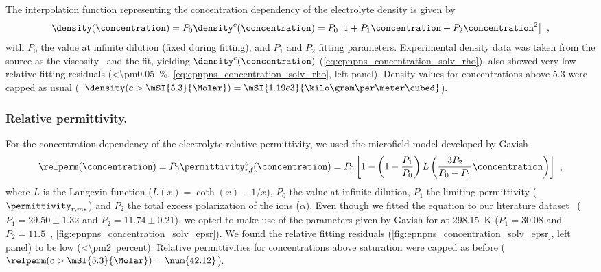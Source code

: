 The interpolation function representing the concentration dependency of the electrolyte density is given by
%
\begin{align}\label{eq:epnpns_concentration_solv_rho}
  \density (\concentration) = P_0 \density^c (\concentration) =
  P_0 \left[ 1
            + P_1 \concentration
            + P_2 \concentration^{2}
      \right]
  \text{ ,}
\end{align}
%
with $P_0$ the value at infinite dilution (fixed during fitting), and $P_1$ and $P_2$ fitting parameters.
Experimental density data was taken from the source as the viscosity~\cite{Hai-Lang-1996} and the fit,
yielding $\density^c (\concentration)$ (\cref{eq:epnpns_concentration_solv_rho}), also showed very low
relative fitting residuals (\SI{<\pm0.05}{\percent}, \cref{eq:epnpns_concentration_solv_rho}, left panel).
Density values for concentrations above \SI{5.3}{\Molar} were capped as usual (\ie~$\density (c >
\mSI{5.3}{\Molar}) = \mSI{1.19e3}{\kilo\gram\per\meter\cubed}$).


\subsubsection{Relative permittivity.}
%

For the concentration dependency of the electrolyte relative permittivity, we used the microfield model
developed by Gavish \etal{}~\cite{Gavish-2016}
%
\begin{align}\label{eq:epnpns_concentration_solv_epsr}
  \relperm (\concentration) = P_0 \permittivity_{r,\text{f}}^c (\concentration) =
  P_0 \left[ 1
              - \left( 1 - \dfrac{P_1}{P_0}\right)
              L \left( \dfrac{3 P_2}{P_0 - P_1} \concentration \right)
      \right]
  \text{ ,}
\end{align}
%
where $L$ is the Langevin function ($L(x) = \coth{(x)} - 1/x$), $P_0$ the value at infinite dilution, $P_1$
the limiting permittivity ($\permittivity_{r,ms}$) and $P_2$ the total excess polarization of the ions
($\alpha$). Even though we fitted the equation to our literature dataset~\cite{Buchner-1999} ($P_1 =
29.50\pm1.32$ and $P_2 = 11.74\pm0.21$), we opted to make use of the parameters given by Gavish for 
at \SI{298.15}{\kelvin} ($P_1 = 30.08$ and $P_2 = 11.5$~\cite{Gavish-2016},
\cref{fig:epnpns_concentration_solv_epsr}). We found the relative fitting residuals
(\cref{fig:epnpns_concentration_solv_epsr}, left panel) to be low (\SI{<\pm2}{percent}). Relative
permittivities for concentrations above saturation were capped as before (\ie~$\relperm (c >
\mSI{5.3}{\Molar}) = \num{42.12}$).


